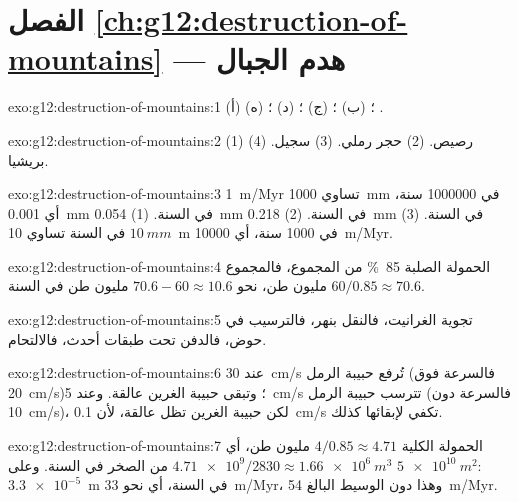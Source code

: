 \section*{الفصل \ref{ch:g12:destruction-of-mountains} --- هدم الجبال}

\begin{solution}{exo:g12:destruction-of-mountains:1}
(أ) ؛ (ب) ؛ (ج) ؛
(د) ؛ (ه) .
\end{solution}

\begin{solution}{exo:g12:destruction-of-mountains:2}
(1) رصيص. (2) حجر رملي. (3) سجيل. (4) بريشيا.
\end{solution}

\begin{solution}{exo:g12:destruction-of-mountains:3}
\qty{1}{m/Myr} تساوي \qty{1000}{mm} في \num{1000000} سنة، أي \qty{0.001}{mm} في
السنة. (1) \qty{0.054}{mm} في السنة. (2) \qty{0.218}{mm} في السنة.
(3) $\qty{10}{mm}$ في السنة تساوي \qty{10}{m} في 1000 سنة، أي \qty{10000}{m/Myr}.
\end{solution}

\begin{solution}{exo:g12:destruction-of-mountains:4}
الحمولة الصلبة \qty{85}{\percent} من المجموع، فالمجموع $60/0.85
\approx 70.6$ مليون طن،  نحو $70.6 - 60 \approx
10.6$ مليون طن في السنة.
\end{solution}

\begin{solution}{exo:g12:destruction-of-mountains:5}
تجوية الغرانيت، فالنقل بنهر، فالترسيب في حوض،
فالدفن تحت طبقات أحدث، فالالتحام.
\end{solution}

\begin{solution}{exo:g12:destruction-of-mountains:6}
عند \qty{30}{cm/s} تُرفع حبيبة الرمل (فالسرعة فوق \qty{20}{cm/s})؛ وتبقى
حبيبة الغرين عالقة. وعند \qty{5}{cm/s} تترسب حبيبة الرمل
(فالسرعة دون \qty{10}{cm/s})، لكن حبيبة الغرين تظل عالقة، لأن
\qty{0.1}{cm/s} تكفي لإبقائها كذلك.
\end{solution}

\begin{solution}{exo:g12:destruction-of-mountains:7}
الحمولة الكلية $4/0.85 \approx 4.71$ مليون طن، أي $\num{4.71e9}/2830 \approx
\qty{1.66e6}{m^3}$ من الصخر في السنة. وعلى $\qty{5e10}{m^2}$: $\num{3.3e-5}$~\unit{m} في
السنة، أي نحو \qty{33}{m/Myr}، وهذا دون الوسيط البالغ \qty{54}{m/Myr}.
\end{solution}

